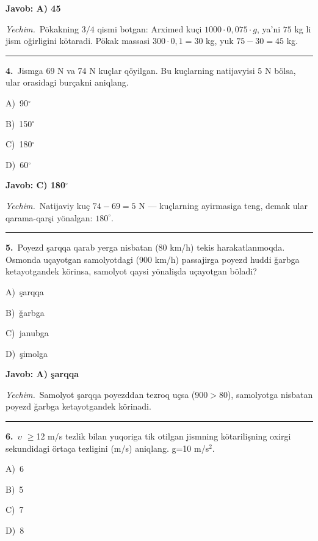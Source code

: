 \documentclass[11pt,a4paper]{article}
\newcommand{\opt}[2]{\hspace*{4mm}#1)\ #2\par}
\begin{document}
\noindent\colorbox{gray!12}{\parbox{\dimexpr\linewidth-2\fboxsep}{\textbf{Javob: A) 45}}}\par\smallskip
\noindent\textit{Yechim.}\ Pökakning $3/4$ qismi botgan: Arximed kuçi $1000\cdot0{,}075\cdot g$, ya’ni $75$ kg li jism oğirligini kötaradi. Pökak massasi $300\cdot0{,}1=30$ kg, yuk $75-30=45$ kg.\par\par\medskip\hrule\medskip
{}\noindent\begin{minipage}{\linewidth}
\textbf{4.}\ Jismga 69 N va 74 N kuçlar qöyilgan. Bu kuçlarning natijavyisi 5 N bölsa, ular orasidagi burçakni aniqlang.\par\smallskip
\opt{A}{90$^\circ$}
\opt{B}{150$^\circ$}
\opt{C}{180$^\circ$}
\opt{D}{60$^\circ$}
\end{minipage}\vspace{2pt}\par
\noindent\colorbox{gray!12}{\parbox{\dimexpr\linewidth-2\fboxsep}{\textbf{Javob: C) 180$^\circ$}}}\par\smallskip
\noindent\textit{Yechim.}\ Natijaviy kuç $74-69=5$ N — kuçlarning ayirmasiga teng, demak ular qarama-qarşi yönalgan: $180^\circ$.\par\par\medskip\hrule\medskip
{}\noindent\begin{minipage}{\linewidth}
\textbf{5.}\ Poyezd şarqqa qarab yerga nisbatan (80 km/h) tekis harakatlanmoqda. Osmonda uçayotgan samolyotdagi (900 km/h) passajirga poyezd huddi ğarbga ketayotgandek körinsa, samolyot qaysi yönalişda uçayotgan böladi?\par\smallskip
\opt{A}{şarqqa}
\opt{B}{ğarbga}
\opt{C}{janubga}
\opt{D}{şimolga}
\end{minipage}\vspace{2pt}\par
\noindent\colorbox{gray!12}{\parbox{\dimexpr\linewidth-2\fboxsep}{\textbf{Javob: A) şarqqa}}}\par\smallskip
\noindent\textit{Yechim.}\ Samolyot şarqqa poyezddan tezroq uçsa ($900>80$), samolyotga nisbatan poyezd ğarbga ketayotgandek körinadi.\par\par\medskip\hrule\medskip
{}\noindent\begin{minipage}{\linewidth}
\textbf{6.}\ $\upsilon$ $\ge$12 m/s tezlik bilan yuqoriga tik otilgan jismning kötarilişning oxirgi sekundidagi örtaça tezligini (m/s) aniqlang. g=10 m/s$^{2}$.\par\smallskip
\opt{A}{6}
\opt{B}{5}
\opt{C}{7}
\opt{D}{8}
\end{minipage}\vspace{2pt}\par
\end{document}
